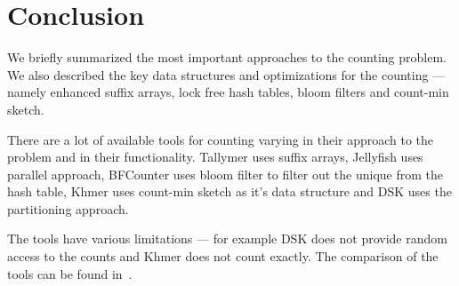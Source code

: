 
\section{Conclusion}

We briefly summarized the most important approaches to the \kmer counting problem. We also described the key data structures and optimizations for the \kmer counting --- namely enhanced suffix arrays, lock free hash tables, bloom filters and count-min sketch.

There are a lot of available tools for \kmer counting varying in their approach to the problem and in their functionality. Tallymer uses suffix arrays, Jellyfish uses parallel approach, BFCounter uses bloom filter to filter out the unique \kmers from the hash table, Khmer uses count-min sketch as it's data structure and DSK uses the partitioning approach.

The tools have various limitations --- for example DSK does not provide random access to the counts and Khmer does not count \kmers exactly.
The comparison of the tools can be found in~\cite{khmer}.
